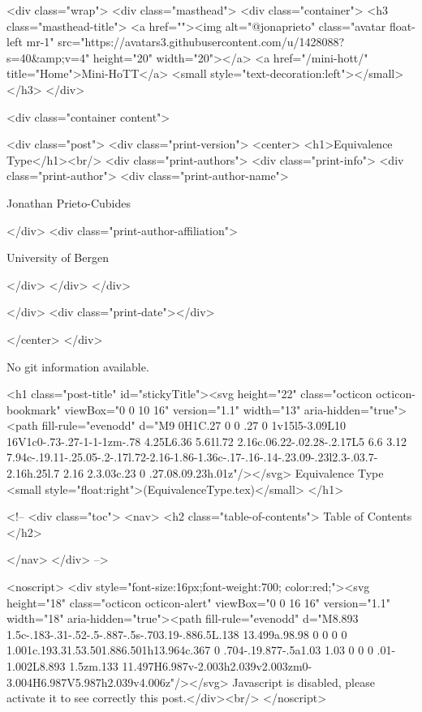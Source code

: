     <div class="wrap">
      <div class="masthead">
        <div class="container">
          <h3 class="masthead-title">
            <a href=""><img alt="@jonaprieto" class="avatar float-left mr-1" src="https://avatars3.githubusercontent.com/u/1428088?s=40&amp;v=4" height="20" width="20"></a>
            <a href="/mini-hott/" title="Home">Mini-HoTT</a>
            <small style="text-decoration:left"></small>
          </h3>
        </div>
      
      <div class="container content">
        







<div class="post">
  <div class="print-version">
    <center>
      <h1>Equivalence Type</h1><br/>
        <div class="print-authors">
          <div class="print-info">
            <div class="print-author">
              <div class="print-author-name">
                
                  Jonathan Prieto-Cubides
                
              </div>
              <div class="print-author-affiliation">
                
                  University of Bergen
                
                </div>
            </div>
          </div>
          
          
        </div>
        <div class="print-date"></div>
        
        
    </center>
  </div>

  
  No git information available.
  

  <h1 class="post-title" id="stickyTitle"><svg height="22" class="octicon octicon-bookmark" viewBox="0 0 10 16" version="1.1" width="13" aria-hidden="true"><path fill-rule="evenodd" d="M9 0H1C.27 0 0 .27 0 1v15l5-3.09L10 16V1c0-.73-.27-1-1-1zm-.78 4.25L6.36 5.61l.72 2.16c.06.22-.02.28-.2.17L5 6.6 3.12 7.94c-.19.11-.25.05-.2-.17l.72-2.16-1.86-1.36c-.17-.16-.14-.23.09-.23l2.3-.03.7-2.16h.25l.7 2.16 2.3.03c.23 0 .27.08.09.23h.01z"/></svg> Equivalence Type <small style="float:right">(EquivalenceType.tex)</small>
  </h1>

  <!-- 
  <div class="toc">
    <nav>
    <h2 class="table-of-contents"> Table of Contents </h2>
      

    </nav>
  </div>
   -->

  <noscript>
  <div style="font-size:16px;font-weight:700; color:red;"><svg height="18" class="octicon octicon-alert" viewBox="0 0 16 16" version="1.1" width="18" aria-hidden="true"><path fill-rule="evenodd" d="M8.893 1.5c-.183-.31-.52-.5-.887-.5s-.703.19-.886.5L.138 13.499a.98.98 0 0 0 0 1.001c.193.31.53.501.886.501h13.964c.367 0 .704-.19.877-.5a1.03 1.03 0 0 0 .01-1.002L8.893 1.5zm.133 11.497H6.987v-2.003h2.039v2.003zm0-3.004H6.987V5.987h2.039v4.006z"/></svg> Javascript is disabled, please activate it to see correctly this post.</div><br/>
  </noscript>

